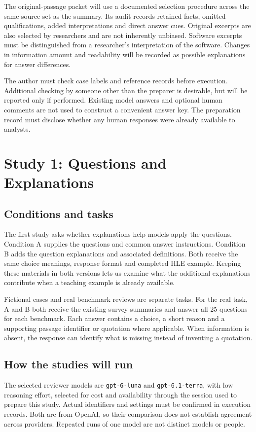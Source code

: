 \documentclass[10pt,conference]{IEEEtran}
\begin{document}
The original-passage packet will use a documented selection procedure across the same source set as the summary. Its audit records retained facts, omitted qualifications, added interpretations and direct answer cues. Original excerpts are also selected by researchers and are not inherently unbiased. Software excerpts must be distinguished from a researcher's interpretation of the software. Changes in information amount and readability will be recorded as possible explanations for answer differences.

The author must check case labels and reference records before execution. Additional checking by someone other than the preparer is desirable, but will be reported only if performed. Existing model answers and optional human comments are not used to construct a convenient answer key. The preparation record must disclose whether any human responses were already available to analysts.

\section{Study 1: Questions and Explanations}
\subsection{Conditions and tasks}
The first study asks whether explanations help models apply the questions. Condition A supplies the questions and common answer instructions. Condition B adds the question explanations and associated definitions. Both receive the same choice meanings, response format and completed HLE example. Keeping these materials in both versions lets us examine what the additional explanations contribute when a teaching example is already available.

Fictional cases and real benchmark reviews are separate tasks. For the real task, A and B both receive the existing survey summaries and answer all 25 questions for each benchmark. Each answer contains a choice, a short reason and a supporting passage identifier or quotation where applicable. When information is absent, the response can identify what is missing instead of inventing a quotation.

\subsection{How the studies will run}
The selected reviewer models are \texttt{gpt-6-luna} and \texttt{gpt-6.1-terra}, with low reasoning effort, selected for cost and availability through the session used to prepare this study. Actual identifiers and settings must be confirmed in execution records. Both are from OpenAI, so their comparison does not establish agreement across providers. Repeated runs of one model are not distinct models or people.
\end{document}
